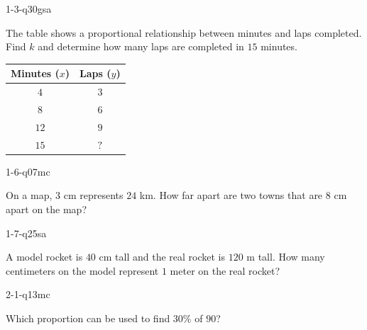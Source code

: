 
\begin{practiceQuestion}{1-3-q30}{gsa}
\begin{questionText}
The table shows a proportional relationship between minutes and laps completed. Find $k$ and determine how many laps are completed in $15$ minutes.

\begin{center}
\begin{tabular}{|c|c|}
\hline
\textbf{Minutes ($x$)} & \textbf{Laps ($y$)} \\ \hline
$4$ & $3$ \\ \hline
$8$ & $6$ \\ \hline
$12$ & $9$ \\ \hline
$15$ & $?$ \\ \hline
\end{tabular}
\end{center}
\end{questionText}
\end{practiceQuestion}

\begin{practiceQuestion}{1-6-q07}{mc}
\begin{questionText}
On a map, $3$ cm represents $24$ km. How far apart are two towns that are $8$ cm apart on the map?
\end{questionText}
\end{practiceQuestion}

\begin{practiceQuestion}{1-7-q25}{sa}
\begin{questionText}
A model rocket is $40$ cm tall and the real rocket is $120$ m tall. How many centimeters on the model represent $1$ meter on the real rocket?
\end{questionText}
\end{practiceQuestion}

\begin{practiceQuestion}{2-1-q13}{mc}
\begin{questionText}
Which proportion can be used to find $30\%$ of $90$?
\end{questionText}
\end{practiceQuestion}

